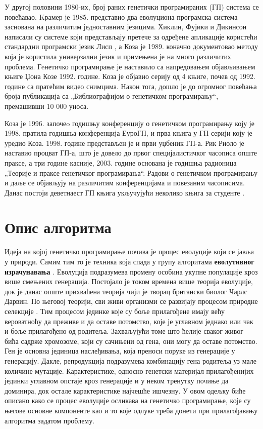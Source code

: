 \documentclass[a4paper]{article}
\begin{document}
У другој половини 1980-их, број раних генетички програмираних (ГП) система се повећавао. Kрамер је 1985. представио два еволуциона програмска система заснована на различитим једноставним језицима. Хиклин, Фујики и Дикинсон написали су системе који представљају претече за одређене апликације користећи стандардни програмски језик Лисп \cite{lisp}, а Коза је 1989. коначно документовао методу која је користила универзални језик и примењена је на много различитих проблема. Гeнетичко програмирање је наставило са напредовањем објављивањем књиге Џона Козе 1992. године. Коза је објавио серију од 4 књиге, почев од 1992. године са пратећим видео снимцима. Након тога, дошло је до огромног повећања броја публикација са „Библиографијом о генетичком програмирању“, премашивши 10 000 уноса.


Коза је 1996. започеo годишњу конференцију о генетичком програмирању  коју је 1998. пратила годишња конференција ЕуроГП, и прва књига у ГП серији коју је уредио Коза. 1998. године представљен је и први уџбеник ГП-а. Рик Риоло је наставио процват ГП-а, што је довело до првог специјалистичког часописа опште праксе, а три године касније, 2003. године основана је годишња радионица „Теорије и праксе генетичког програмирања“. Радови о генетичком програмирању и даље се објављују на различитим конференцијама и повезаним часописима. Данас постоји деветнаест ГП књига укључујући неколико књига за студенте \cite{genetic_algorithms}.


\section{Опис алгоритма}

Идеја на којој генетичко програмирање почива је процес еволуције који се јавља у природи. Самим тим то је техника која спада у групу алгоритама  \textbf{еволутивног израчунавања} \cite{compIntelligence}. Еволуција подразумева промену особина укупне популације кроз више смењених генерација. Постојало је током времена више теорија еволуције, док је данас опште прихваћена теорија чији је творац британски биолог Чарлс Дарвин. По његовој теорији, сви живи организми се развијају процесом природне селекције \cite{darwin1859}. Тим процесом јединке које су боље прилагођене имају већу вероватноћу да преживе и да оставе потомство, које је углавном једнако или чак и боље прилагођено од родитеља. Захваљујући томе што ћелије сваког живог бића садрже хромозоме, који су сачињени од гена, они могу да оставе потомство. Ген је основна јединица наслеђивања, која преноси поруке из генерације у генерацију. Дакле, репродукција подразумева комбинацију гена родитеља уз мале количине мутације. Карактеристике, односно генетски материјал прилагођенијих јединки углавном опстаје кроз генерације и у неком тренутку почиње да доминира, док остале карактеристике најчешће ишчезну. У овом одељку биће описано како се процес еволуције осликава на генетичко програмирање, које су његове основне компоненте као и то које одлуке треба донети при прилагођавању алгоритма задатом проблему.
\end{document}
